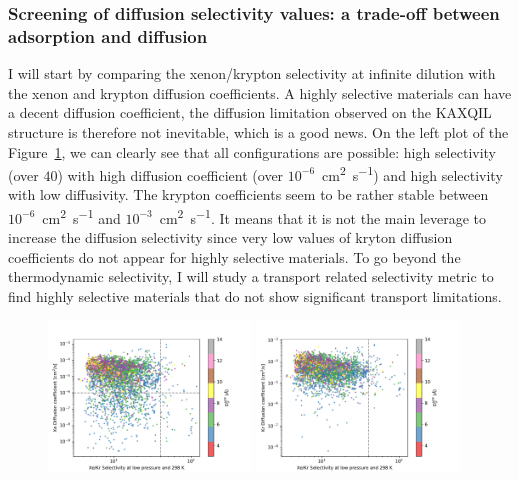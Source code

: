 \documentclass[main]{subfiles}
\begin{document}
\subsubsection{Screening of diffusion selectivity values: a trade-off between adsorption and diffusion}\label{sct:diff_screen}

I will start by comparing the xenon/krypton selectivity at infinite dilution with the xenon and krypton diffusion coefficients. A highly selective materials can have a decent diffusion coefficient, the diffusion limitation observed on the KAXQIL structure is therefore not inevitable, which is a good news. On the left plot of the Figure~\ref{fgr:diff_s0_lcd}, we can clearly see that all configurations are possible: high selectivity (over $40$) with high diffusion coefficient (over $10^{-6}$~\si{\square\cm\per\s}) and high selectivity with low diffusivity. The krypton coefficients seem to be rather stable between $10^{-6}$~\si{\square\cm\per\s} and $10^{-3}$~\si{\square\cm\per\s}. It means that it is not the main leverage to increase the diffusion selectivity since very low values of kryton diffusion coefficients do not appear for highly selective materials. To go beyond the thermodynamic selectivity, I will study a transport related selectivity metric to find highly selective materials that do not show significant transport limitations.

\begin{figure}[ht]
  \centering
    \includegraphics[width=0.48\textwidth]{figures/5-diffusion/D_xe-s0-lcd.pdf}
    \includegraphics[width=0.48\textwidth]{figures/5-diffusion/D_kr-s0-lcd.pdf}
    \caption{}\label{fgr:diff_s0_lcd}
\end{figure}
\end{document}
